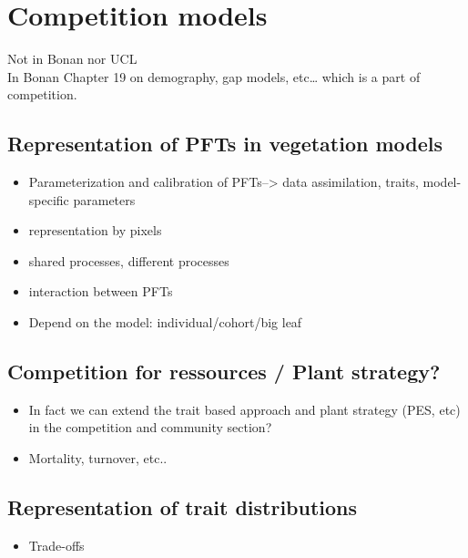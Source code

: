 \documentclass[oneside]{book}
\providecommand{\tightlist}{%
  \setlength{\itemsep}{0pt}\setlength{\parskip}{0pt}}
\begin{document}
\section{Competition models}\label{competition-models}

Not in Bonan nor UCL\\
In Bonan Chapter 19 on demography, gap models, etc\ldots{} which is a
part of competition.

\subsection{Representation of PFTs in vegetation
models}\label{representation-of-pfts-in-vegetation-models}

\begin{itemize}
\tightlist
\item
  Parameterization and calibration of PFTs--\textgreater{} data
  assimilation, traits, model-specific parameters
\item
  representation by pixels
\item
  shared processes, different processes
\item
  interaction between PFTs
\item
  Depend on the model: individual/cohort/big leaf
\end{itemize}

\subsection{Competition for ressources / Plant
strategy?}\label{competition-for-ressources-plant-strategy}

\begin{itemize}
\tightlist
\item
  In fact we can extend the trait based approach and plant strategy
  (PES, etc) in the competition and community section?
\item
  Mortality, turnover, etc..
\end{itemize}

\subsection{Representation of trait
distributions}\label{representation-of-trait-distributions}

\begin{itemize}
\tightlist
\item
  Trade-offs
\end{itemize}
\end{document}
